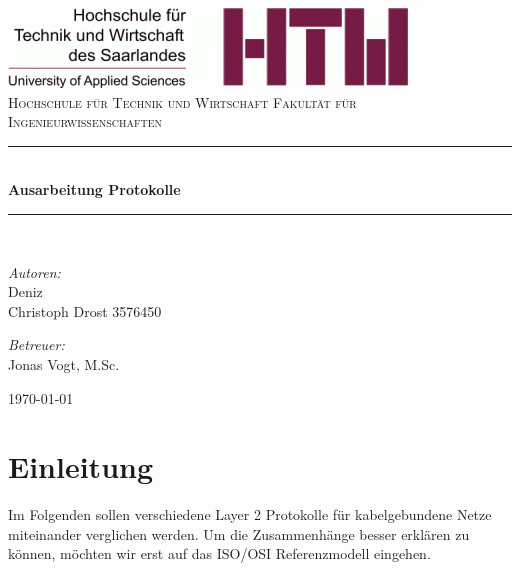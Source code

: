 \documentclass[12pt, a4paper, ngerman]{article}
\newcommand{\osi}{ISO/OSI Referenzmodell\xspace}
\begin{document}
\begin{titlepage}
		\begin{center}
			\includegraphics[width=.8\linewidth]{Grafiken/logo_htw.jpg}\\[1cm]    
			\textsc{\LARGE Hochschule für Technik und Wirtschaft \newline Fakultät für Ingenieurwissenschaften}\\[1.5cm]
			\newcommand{\HRule}{\rule{\linewidth}{0.5mm}} \HRule \\[0.4cm] { \huge \bfseries Ausarbeitung Protokolle}\\[0.4cm]
			\HRule \\[1.5cm]

			\begin{minipage}{0.4\textwidth}
				\begin{flushleft} \large
					\emph{Autoren:}\\
					Deniz \\
					Christoph Drost 3576450
				\end{flushleft}
			\end{minipage}
			\hfill
			\begin{minipage}{0.4\textwidth}
				\begin{flushright} \large
					\emph{Betreuer:} \\
					Jonas Vogt, M.Sc.
				\end{flushright}
			\end{minipage}
			\vfill
			{\large \today}
		\end{center}
	\end{titlepage}


\tableofcontents
\newpage 

\section{Einleitung}
Im Folgenden sollen verschiedene Layer 2 Protokolle für kabelgebundene Netze miteinander verglichen werden. Um die Zusammenhänge besser erklären zu können, möchten wir erst auf das \osi eingehen.
\end{document}
